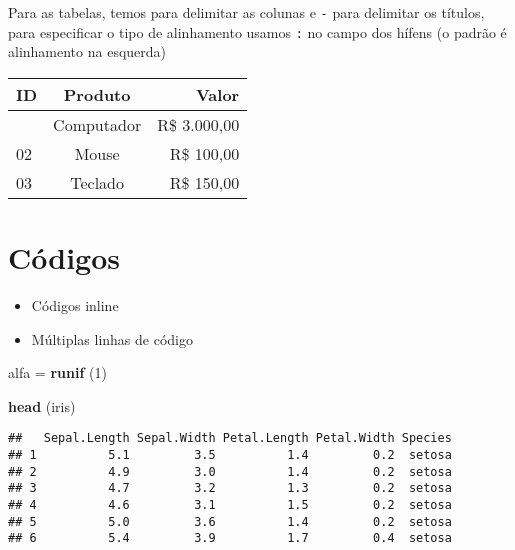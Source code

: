 \documentclass[
]{article}
\newenvironment{Shaded}{\begin{snugshade}}{\end{snugshade}}
\newcommand{\DecValTok}[1]{\textcolor[rgb]{0.00,0.00,0.81}{#1}}
\newcommand{\FunctionTok}[1]{\textcolor[rgb]{0.13,0.29,0.53}{\textbf{#1}}}
\newcommand{\NormalTok}[1]{#1}
\newcommand{\OtherTok}[1]{\textcolor[rgb]{0.56,0.35,0.01}{#1}}
\newcommand{\SpecialCharTok}[1]{\textcolor[rgb]{0.81,0.36,0.00}{\textbf{#1}}}
\providecommand{\tightlist}{%
  \setlength{\itemsep}{0pt}\setlength{\parskip}{0pt}}
\begin{document}
Para as tabelas, temos \texttt{\textbar{}} para delimitar as colunas e
\texttt{-} para delimitar os títulos, para especificar o tipo de
alinhamento usamos \texttt{:} no campo dos hífens (o padrão é
alinhamento na esquerda)

\begin{longtable}[]{@{}lcr@{}}
\toprule\noalign{}
ID & Produto & Valor \\
\midrule\noalign{}
\endhead
\bottomrule\noalign{}
\endlastfoot
01 & Computador & R\$ 3.000,00 \\
02 & Mouse & R\$ 100,00 \\
03 & Teclado & R\$ 150,00 \\
\end{longtable}

\section{Códigos}\label{cuxf3digos}

\begin{itemize}
\tightlist
\item
  Códigos inline
\item
  Múltiplas linhas de código
\end{itemize}

\begin{Shaded}
\begin{Highlighting}[]
\NormalTok{alfa }\OtherTok{=} \FunctionTok{runif}\NormalTok{ (}\DecValTok{1}\NormalTok{)}

\FunctionTok{head}\NormalTok{ (iris)}
\end{Highlighting}
\end{Shaded}

\begin{verbatim}
##   Sepal.Length Sepal.Width Petal.Length Petal.Width Species
## 1          5.1         3.5          1.4         0.2  setosa
## 2          4.9         3.0          1.4         0.2  setosa
## 3          4.7         3.2          1.3         0.2  setosa
## 4          4.6         3.1          1.5         0.2  setosa
## 5          5.0         3.6          1.4         0.2  setosa
## 6          5.4         3.9          1.7         0.4  setosa
\end{verbatim}

\begin{Shaded}
\end{Shaded}
\end{document}
